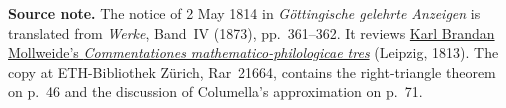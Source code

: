 \par\medskip\begin{small}\noindent\textbf{Source note.} The notice of 2 May 1814 in \textit{Göttingische gelehrte Anzeigen} is translated from \textit{Werke}, Band~IV (1873), pp.~361--362. It reviews \href{https://www.e-rara.ch/zut/content/titleinfo/15849974}{Karl Brandan Mollweide's \textit{Commentationes mathematico-philologicae tres}} (Leipzig, 1813). The copy at ETH-Bibliothek Zürich, Rar~21664, contains the right-triangle theorem on p.~46 and the discussion of Columella's approximation on p.~71.\par\end{small}
